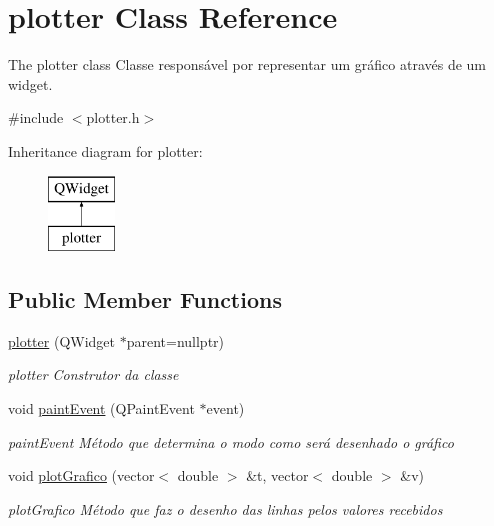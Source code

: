 \hypertarget{classplotter}{}\section{plotter Class Reference}
\label{classplotter}


The plotter class Classe responsável por representar um gráfico através de um widget.  




{\ttfamily \#include $<$plotter.\+h$>$}

Inheritance diagram for plotter\+:\begin{figure}[H]
\begin{center}
\leavevmode
\includegraphics[height=2.000000cm]{classplotter}
\end{center}
\end{figure}
\subsection*{Public Member Functions}
\begin{DoxyCompactItemize}
\item 
\mbox{\hyperlink{classplotter_a6132b1d35e08cf0345c6ae6cc4ed5618}{plotter}} (Q\+Widget $\ast$parent=nullptr)
\begin{DoxyCompactList}\small\item\em plotter Construtor da classe \end{DoxyCompactList}\item 
void \mbox{\hyperlink{classplotter_ac1fd83a3a57494cdacbe03fa28c98ce5}{paint\+Event}} (Q\+Paint\+Event $\ast$event)
\begin{DoxyCompactList}\small\item\em paint\+Event Método que determina o modo como será desenhado o gráfico \end{DoxyCompactList}\item 
void \mbox{\hyperlink{classplotter_af9cd37923cfa75a3b4352d7d0c38d67f}{plot\+Grafico}} (vector$<$ double $>$ \&t, vector$<$ double $>$ \&v)
\begin{DoxyCompactList}\small\item\em plot\+Grafico Método que faz o desenho das linhas pelos valores recebidos \end{DoxyCompactList}\end{DoxyCompactItemize}


